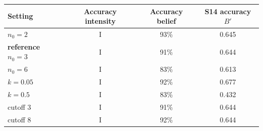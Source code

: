 \begin{tabular}{lccc}
\toprule
Setting & Accuracy intensity & Accuracy belief & S14 accuracy $B'$ \\
\midrule
$n_0=2$ & I & 93\% & 0.645 \\
\textbf{reference} $n_0=3$ & I & 91\% & 0.644 \\
$n_0=6$ & I & 83\% & 0.613 \\
$k=0.05$ & I & 92\% & 0.677 \\
$k=0.5$ & I & 83\% & 0.432 \\
cutoff $3$ & I & 91\% & 0.644 \\
cutoff $8$ & I & 92\% & 0.644 \\
\bottomrule
\end{tabular}
